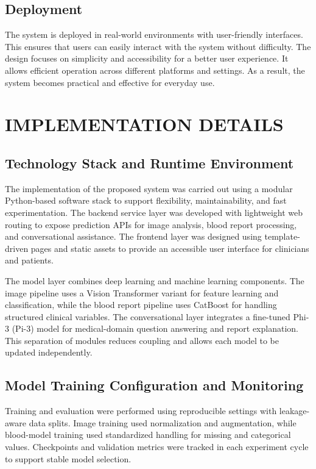 \documentclass[a4paper,12pt]{report}
\begin{document}
\begin{doublespace}
\subsection{Deployment}
The system is deployed in real-world environments with user-friendly interfaces. This ensures that users can easily interact with the system without difficulty. The design focuses on simplicity and accessibility for a better user experience. It allows efficient operation across different platforms and settings. As a result, the system becomes practical and effective for everyday use.

\section{IMPLEMENTATION DETAILS}
\label{sec:implementation_details}

\subsection{Technology Stack and Runtime Environment}
The implementation of the proposed system was carried out using a modular Python-based software stack to support flexibility, maintainability, and fast experimentation. The backend service layer was developed with lightweight web routing to expose prediction APIs for image analysis, blood report processing, and conversational assistance. The frontend layer was designed using template-driven pages and static assets to provide an accessible user interface for clinicians and patients.

The model layer combines deep learning and machine learning components. The image pipeline uses a Vision Transformer variant for feature learning and classification, while the blood report pipeline uses CatBoost for handling structured clinical variables. The conversational layer integrates a fine-tuned Phi-3 (Pi-3) model for medical-domain question answering and report explanation. This separation of modules reduces coupling and allows each model to be updated independently.

\subsection{Model Training Configuration and Monitoring}
Training and evaluation were performed using reproducible settings with leakage-aware data splits. Image training used normalization and augmentation, while blood-model training used standardized handling for missing and categorical values. Checkpoints and validation metrics were tracked in each experiment cycle to support stable model selection.



\end{doublespace}
\end{document}

